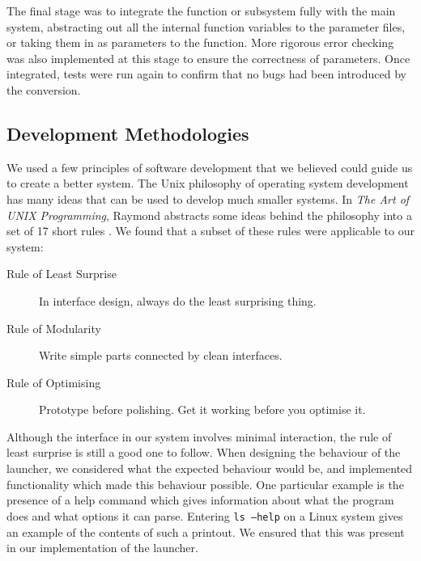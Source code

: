 \documentclass[a4paper,11pt]{article}
\begin{document}
   The final stage was to integrate the function or subsystem fully with the
   main system, abstracting out all the internal function variables to the
   parameter files, or taking them in as parameters to the function. More
   rigorous error checking was also implemented at this stage to ensure the
   correctness of parameters. Once integrated, tests were run again to confirm
   that no bugs had been introduced by the conversion.
\subsection{Development Methodologies}
\label{sec-7-2}

   We used a few principles of software development that we believed could guide
   us to create a better system. The Unix philosophy of operating system
   development has many ideas that can be used to develop much smaller
   systems. In \emph{The Art of UNIX Programming}, Raymond abstracts some ideas
   behind the philosophy into a set of 17 short rules \cite{artunix}. We found
   that a subset of these rules were applicable to our system:

   \begin{description}
   \item[Rule of Least Surprise] In interface design, always do the least
   surprising thing.
   \item[Rule of Modularity] Write simple parts connected by clean interfaces.
   \item[Rule of Optimising] Prototype before polishing. Get it working before
   you optimise it.
   \end{description}
   
   Although the interface in our system involves minimal interaction, the rule
   of least surprise is still a good one to follow. When designing the behaviour
   of the launcher, we considered what the expected behaviour would be, and
   implemented functionality which made this behaviour possible. One particular
   example is the presence of a help command which gives information about what
   the program does and what options it can parse. Entering \texttt{ls --help}
   on a Linux system gives an example of the contents of such a printout. We
   ensured that this was present in our implementation of the launcher.
\end{document}
